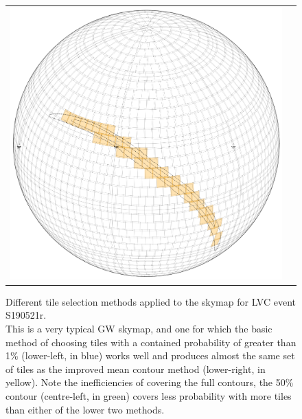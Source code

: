 \begin{colsection}
\begin{colsection}
\begin{figure}[p]
\begin{center}
\begin{tabular}{cc}
            \includegraphics[width=0.25\linewidth]{images/tiling/1_b.png} \\
        \end{tabular}
    \end{center}
    \caption[Different tile selection methods for S190521r]{
        Different tile selection methods applied to the skymap for LVC event S190521r.\\
        This is a very typical GW skymap, and one for which the basic method of choosing tiles with a contained probability of greater than 1\% (lower-left, in blue) works well and produces almost the same set of tiles as the improved mean contour method (lower-right, in yellow). Note the inefficiencies of covering the full contours, the 50\% contour (centre-left, in green) covers less probability with more tiles than either of the lower two methods.
    }\label{fig:tiling_S190521r}
\end{figure}

\newpage


\end{colsection}
\end{colsection}
